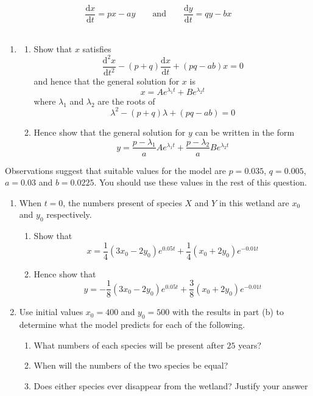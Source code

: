 \documentclass[leqno]{article}
\begin{document}
\begin{enumerate}[
  label=\textbf{\arabic*.},
  leftmargin=*,
  topsep=0pt,
  partopsep=0pt,
  parsep=0pt
]
\[\frac{\mathrm{d}x}{\mathrm{d}t}=px-ay \qquad \text{and} \qquad \frac{\mathrm{d}y}{\mathrm{d}t}=qy-bx\] \\
\begin{enumerate}[label=\textbf{(\alph*)}]
  \item 
  \begin{enumerate}[label=(\roman*)]
    \item Show that $x$ satisfies
    \[\frac{\mathrm{d}^2 x}{\mathrm{d}t^2}-(p+q)\frac{\mathrm{d}x}{\mathrm{d}t}+(pq-ab)x=0\]
    and hence that the general solution for $x$ is
    \[x=Ae^{\lambda_1 t}+Be^{\lambda_2 t}\]
    where $\lambda_1$ and $\lambda_2$ are the roots of
    \[\lambda^2-(p+q)\lambda+(pq-ab)=0\]
    \item Hence show that the general solution for $y$ can be written in the form
    \[y=\frac{p-\lambda_1}{a}Ae^{\lambda_1 t}+\frac{p-\lambda_2}{a}Be^{\lambda_2 t}\]
  \end{enumerate}
\end{enumerate}
Observations suggest that suitable values for the model are $p=0.035$, $q=0.005$, $a=0.03$ and $b=0.0225$. You should use these values in the rest of this question. \\
\begin{enumerate}[label=\textbf{(\alph*)}, resume]
  \item When $t=0$, the numbers present of species $X$ and $Y$ in this wetland are $x_0$ and $y_0$ respectively.
  \begin{enumerate}[label=(\roman*)]
    \item Show that
    \[x=\frac{1}{4}(3x_0-2y_0)e^{0.05t}+\frac{1}{4}(x_0+2y_0)e^{-0.01t}\]
    \item Hence show that
    \[y=-\frac{1}{8}(3x_0-2y_0)e^{0.05t}+\frac{3}{8}(x_0+2y_0)e^{-0.01t}\]
  \end{enumerate}
  \item Use initial values $x_0=400$ and $y_0=500$ with the results in part (b) to determine what the model predicts for each of the following. \\
  \begin{enumerate}[label=(\roman*)]
    \item What numbers of each species will be present after $25$ years?  
    \item When will the numbers of the two species be equal? 
    \item Does either species ever disappear from the wetland? Justify your answer  \\

\end{enumerate}
\end{enumerate}
\end{enumerate}
\end{document}
